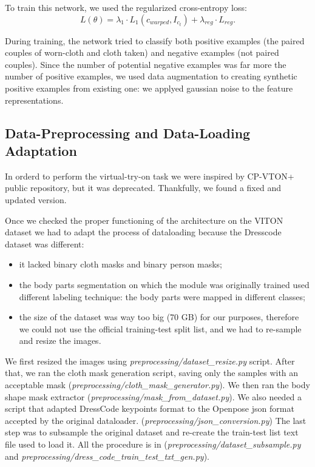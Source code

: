 To train this network, we used the regularized cross-entropy loss:
\begin{equation}
L(\theta) = \lambda_1 \cdot L_1(c_{warped}, I_{c_t}) + \lambda_{reg} \cdot L_{reg} .
\end{equation}

During training, the network tried to classify both positive examples (the paired couples of worn-cloth and cloth taken) and negative examples (not paired couples). Since the number of potential negative examples was far more the number of positive examples, we used data augmentation to creating synthetic positive examples from existing one: we applyed gaussian noise to the feature representations.


\subsection{Data-Preprocessing and Data-Loading Adaptation}
In orderd to perform the virtual-try-on task we were inspired by CP-VTON+ \cite{CP-VTON+} public repository, but it was deprecated. Thankfully, we found a fixed and updated version.


Once we checked the proper functioning of the architecture on the VITON dataset we had to adapt the process of dataloading because the Dresscode dataset was different:
\begin{itemize}
\item it lacked binary cloth masks and binary person masks;
\item the body parts segmentation on which the module was originally trained used different labeling technique: the body parts were mapped in different classes;
\item the size of the dataset was way too big (70 GB) for our purposes, therefore we could not use the official training-test split list, and we had to re-sample and resize the images.
\end{itemize}

We first resized the images using \textit{preprocessing/dataset\_resize.py} script. 
After that, we ran the cloth mask generation script, saving only the samples with an acceptable mask (\textit{preprocessing/cloth\_mask\_generator.py}).
We then ran the body shape mask extractor (\textit{preprocessing/mask\_from\_dataset.py}).
We also needed a script that adapted DressCode keypoints format to the Openpose json format accepted by the original dataloader. (\textit{preprocessing/json\_conversion.py})
The last step was to subsample the original dataset and re-create the train-test list text file used to load it. All the procedure is in (\textit{preprocessing/dataset\_subsample.py} and \textit{preprocessing/dress\_code\_train\_test\_txt\_gen.py}).

